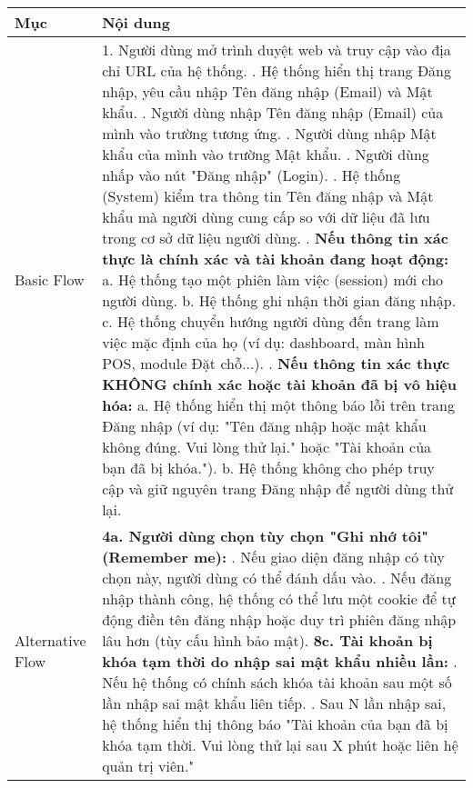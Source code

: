 \begin{longtable}{|m{4cm}|p{11cm}|}
\hline
\textbf{Mục} & \textbf{Nội dung} \\
\hline
Basic Flow & 1. Người dùng mở trình duyệt web và truy cập vào địa chỉ URL của hệ thống. \newline 2. Hệ thống hiển thị trang Đăng nhập, yêu cầu nhập Tên đăng nhập (Email) và Mật khẩu. \newline 3. Người dùng nhập Tên đăng nhập (Email) của mình vào trường tương ứng. \newline 4. Người dùng nhập Mật khẩu của mình vào trường Mật khẩu. \newline 5. Người dùng nhấp vào nút "Đăng nhập" (Login). \newline 6. Hệ thống (System) kiểm tra thông tin Tên đăng nhập và Mật khẩu mà người dùng cung cấp so với dữ liệu đã lưu trong cơ sở dữ liệu người dùng. \newline 7. \textbf{Nếu thông tin xác thực là chính xác và tài khoản đang hoạt động:} \newline    a. Hệ thống tạo một phiên làm việc (session) mới cho người dùng. \newline    b. Hệ thống ghi nhận thời gian đăng nhập. \newline    c. Hệ thống chuyển hướng người dùng đến trang làm việc mặc định của họ (ví dụ: dashboard, màn hình POS, module Đặt chỗ...). \newline 8. \textbf{Nếu thông tin xác thực KHÔNG chính xác hoặc tài khoản đã bị vô hiệu hóa:} \newline    a. Hệ thống hiển thị một thông báo lỗi trên trang Đăng nhập (ví dụ: "Tên đăng nhập hoặc mật khẩu không đúng. Vui lòng thử lại." hoặc "Tài khoản của bạn đã bị khóa."). \newline    b. Hệ thống không cho phép truy cập và giữ nguyên trang Đăng nhập để người dùng thử lại. \\
\hline
Alternative Flow & \textbf{4a. Người dùng chọn tùy chọn "Ghi nhớ tôi" (Remember me):} \newline    1. Nếu giao diện đăng nhập có tùy chọn này, người dùng có thể đánh dấu vào. \newline    2. Nếu đăng nhập thành công, hệ thống có thể lưu một cookie để tự động điền tên đăng nhập hoặc duy trì phiên đăng nhập lâu hơn (tùy cấu hình bảo mật). \newline \textbf{8c. Tài khoản bị khóa tạm thời do nhập sai mật khẩu nhiều lần:} \newline    1. Nếu hệ thống có chính sách khóa tài khoản sau một số lần nhập sai mật khẩu liên tiếp. \newline    2. Sau N lần nhập sai, hệ thống hiển thị thông báo "Tài khoản của bạn đã bị khóa tạm thời. Vui lòng thử lại sau X phút hoặc liên hệ quản trị viên." \\

\end{longtable}
